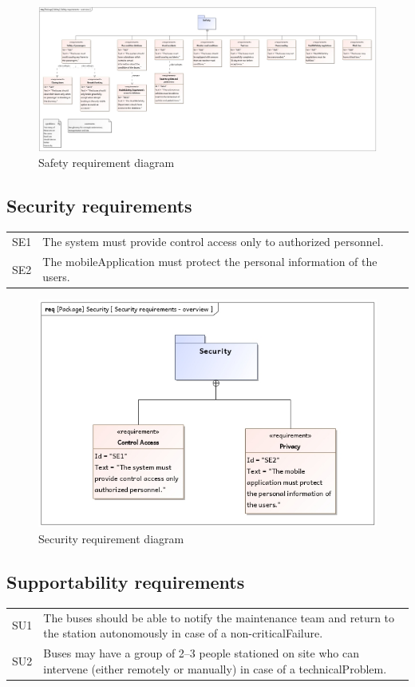 \documentclass[a4paper]{article}
\begin{document}
\begin{figure}
	\centering
	\includegraphics[width=\textwidth]{req-safety.jpg}
	\caption{Safety requirement diagram}%
	\label{fig:req-safety}
\end{figure}

\subsection{Security requirements}
\begin{tabularx}{\textwidth}{p{.9cm} X}
	SE1 & The system must provide control access only to \gls{authorized}
	      personnel. \\

	SE2 & The \gls{mobileApplication} must protect the personal information
	      of the users. \\
\end{tabularx}

\begin{figure}
	\centering
	\includegraphics[width=.75\textwidth]{req-security.jpg}
	\caption{Security requirement diagram}%
	\label{fig:req-security}
\end{figure}

\subsection{Supportability requirements}
\begin{tabularx}{\textwidth}{p{.9cm} X}
	SU1 & The buses should be able to notify the maintenance team and return
	      to the \gls{station} \gls{autonomous}ly in case of a
	      \gls{non-criticalFailure}. \\

	SU2 & Buses may have a group of 2–3 people \gls{station}ed on \gls{site}
	      who can intervene (either remotely or manually) in case of a
	      \gls{technicalProblem}. \\
\end{tabularx}
\end{document}
